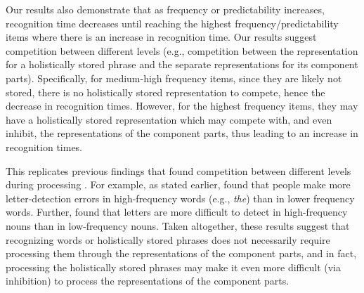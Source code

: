 \documentclass[
  authoryear,
  preprint,
  1p,
  onecolumn]{elsarticle}
\begin{document}
Our results also demonstrate that as frequency or predictability
increases, recognition time decreases until reaching the highest
frequency/predictability items where there is an increase in recognition
time. Our results suggest competition between different levels (e.g.,
competition between the representation for a holistically stored phrase
and the separate representations for its component parts). Specifically,
for medium-high frequency items, since they are likely not stored, there
is no holistically stored representation to compete, hence the decrease
in recognition times. However, for the highest frequency items, they may
have a holistically stored representation which may compete with, and
even inhibit, the representations of the component parts, thus leading
to an increase in recognition times.

This replicates previous findings that found competition between
different levels during processing
\citep[e.g.,][]{kapatsinski2009, healy1976, healy1994, minkoff2000}. For
example, as stated earlier, \citet{healy1976} found that people make
more letter-detection errors in high-frequency words (e.g., \emph{the})
than in lower frequency words. Further, \citet{minkoff2000} found that
letters are more difficult to detect in high-frequency nouns than in
low-frequency nouns. Taken altogether, these results suggest that
recognizing words or holistically stored phrases does not necessarily
require processing them through the representations of the component
parts, and in fact, processing the holistically stored phrases may make
it even more difficult (via inhibition) to process the representations
of the component parts.
\end{document}
